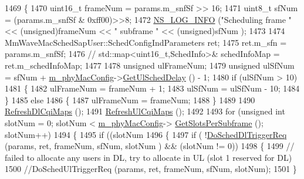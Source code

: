 \begin{DoxyCode}
1469 \{
1470         uint16\_t frameNum = params.m\_snfSf >> 16;
1471         uint8\_t  sfNum = (params.m\_snfSf & 0xff00)>>8;
1472         \hyperlink{group__logging_gafbd73ee2cf9f26b319f49086d8e860fb}{NS\_LOG\_INFO} (\textcolor{stringliteral}{"Scheduling frame "}<< (\textcolor{keywordtype}{unsigned})frameNum << \textcolor{stringliteral}{" subframe "} << (\textcolor{keywordtype}{unsigned})sfNum
       );
1473 
1474         MmWaveMacSchedSapUser::SchedConfigIndParameters ret;
1475         ret.m\_sfn = params.m\_snfSf;
1476         \textcolor{comment}{//      std::map<uint16\_t,SchedInfo>& schedInfoMap = ret.m\_schedInfoMap;}
1477 
1478         \textcolor{keywordtype}{unsigned} ulFrameNum;
1479         \textcolor{keywordtype}{unsigned} ulSfNum = sfNum + \hyperlink{classns3_1_1MmWaveMacScheduler_a24d7af4971d2e500fe543cefbafa2fd9}{m\_phyMacConfig}->\hyperlink{classns3_1_1MmWavePhyMacCommon_afd70935ec71838fefe6a8e18198f19cb}{GetUlSchedDelay} () - 1;
1480         \textcolor{keywordflow}{if} (ulSfNum > 10)
1481         \{
1482                 ulFrameNum = frameNum + 1;
1483                 ulSfNum = ulSfNum - 10;
1484         \}
1485         \textcolor{keywordflow}{else}
1486         \{
1487                 ulFrameNum = frameNum;
1488         \}
1489 
1490         \hyperlink{classns3_1_1MmWaveRrMacScheduler_a7e934e11a18ac6fccd3eb11e41693523}{RefreshDlCqiMaps} ();
1491         \hyperlink{classns3_1_1MmWaveRrMacScheduler_a08bd59d628f7a0115392e00c9cf44c59}{RefreshUlCqiMaps} ();
1492 
1493         \textcolor{keywordflow}{for} (\textcolor{keywordtype}{unsigned} \textcolor{keywordtype}{int} slotNum = 0; slotNum < \hyperlink{classns3_1_1MmWaveMacScheduler_a24d7af4971d2e500fe543cefbafa2fd9}{m\_phyMacConfig}->
      \hyperlink{classns3_1_1MmWavePhyMacCommon_a7b6552d2e0ffbeaf3bc2f9db6d0d6e63}{GetSlotsPerSubframe} (); slotNum++)
1494         \{
1495                 \textcolor{keywordflow}{if} ((slotNum %
1496                 \{
1497                         \textcolor{keywordflow}{if} ( !\hyperlink{classns3_1_1MmWaveRrMacScheduler_a17b839c05a05ce1ef83b9b806c943789}{DoSchedDlTriggerReq} (params, ret, frameNum, sfNum, slotNum
      ) && (slotNum != 0))
1498                         \{
1499                                 \textcolor{comment}{// failed to allocate any users in DL, try to allocate in UL (slot 1
       reserved for DL)}
1500                                 \textcolor{comment}{//DoSchedUlTriggerReq (params, ret, frameNum, sfNum, slotNum);}
1501                         \}

\end{DoxyCode}

